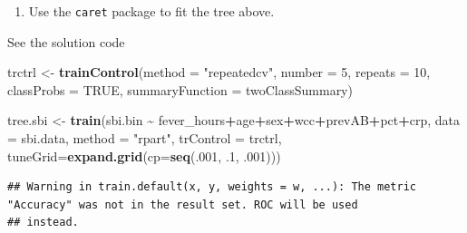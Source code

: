 \documentclass[
]{book}
\newenvironment{Shaded}{\begin{snugshade}}{\end{snugshade}}
\newcommand{\AttributeTok}[1]{\textcolor[rgb]{0.13,0.29,0.53}{#1}}
\newcommand{\ConstantTok}[1]{\textcolor[rgb]{0.56,0.35,0.01}{#1}}
\newcommand{\DecValTok}[1]{\textcolor[rgb]{0.00,0.00,0.81}{#1}}
\newcommand{\FunctionTok}[1]{\textcolor[rgb]{0.13,0.29,0.53}{\textbf{#1}}}
\newcommand{\NormalTok}[1]{#1}
\newcommand{\OtherTok}[1]{\textcolor[rgb]{0.56,0.35,0.01}{#1}}
\newcommand{\SpecialCharTok}[1]{\textcolor[rgb]{0.81,0.36,0.00}{\textbf{#1}}}
\newcommand{\StringTok}[1]{\textcolor[rgb]{0.31,0.60,0.02}{#1}}
\providecommand{\tightlist}{%
  \setlength{\itemsep}{0pt}\setlength{\parskip}{0pt}}
\begin{document}
\begin{enumerate}
\def\labelenumi{\arabic{enumi})}
\tightlist
\item
  Use the \texttt{caret} package to fit the tree above.
\end{enumerate}

See the solution code

\begin{Shaded}
\begin{Highlighting}[]
\NormalTok{trctrl      }\OtherTok{\textless{}{-}} \FunctionTok{trainControl}\NormalTok{(}\AttributeTok{method =} \StringTok{"repeatedcv"}\NormalTok{, }
                            \AttributeTok{number =} \DecValTok{5}\NormalTok{, }
                            \AttributeTok{repeats =} \DecValTok{10}\NormalTok{,}
                             \AttributeTok{classProbs =} \ConstantTok{TRUE}\NormalTok{,  }
                            \AttributeTok{summaryFunction =}\NormalTok{ twoClassSummary)}

\NormalTok{tree.sbi    }\OtherTok{\textless{}{-}} \FunctionTok{train}\NormalTok{(sbi.bin }\SpecialCharTok{\textasciitilde{}}\NormalTok{ fever\_hours}\SpecialCharTok{+}\NormalTok{age}\SpecialCharTok{+}\NormalTok{sex}\SpecialCharTok{+}\NormalTok{wcc}\SpecialCharTok{+}\NormalTok{prevAB}\SpecialCharTok{+}\NormalTok{pct}\SpecialCharTok{+}\NormalTok{crp,}
                            \AttributeTok{data =}\NormalTok{ sbi.data,}
                            \AttributeTok{method =} \StringTok{"rpart"}\NormalTok{,}
                            \AttributeTok{trControl =}\NormalTok{ trctrl,}
                            \AttributeTok{tuneGrid=}\FunctionTok{expand.grid}\NormalTok{(}\AttributeTok{cp=}\FunctionTok{seq}\NormalTok{(.}\DecValTok{001}\NormalTok{, .}\DecValTok{1}\NormalTok{, .}\DecValTok{001}\NormalTok{)))}
\end{Highlighting}
\end{Shaded}

\begin{verbatim}
## Warning in train.default(x, y, weights = w, ...): The metric "Accuracy" was not in the result set. ROC will be used
## instead.
\end{verbatim}

\begin{Shaded}
\end{Shaded}
\end{document}

